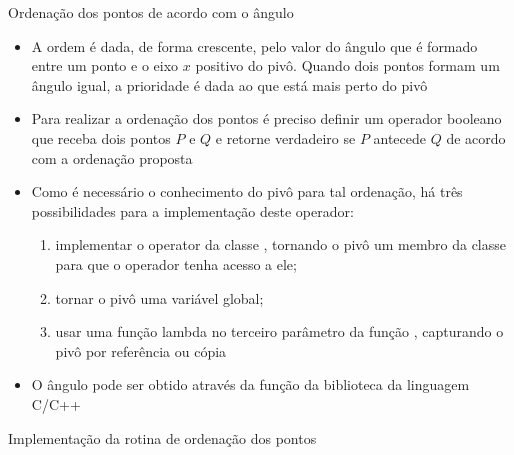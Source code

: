 \begin{frame}[fragile]{Ordenação dos pontos de acordo com o ângulo}

    \begin{itemize}
        \item A ordem é dada, de forma crescente, pelo valor do ângulo que é formado entre um
           ponto e o eixo $x$ positivo do pivô. Quando dois pontos formam um ângulo igual,
           a prioridade é dada ao que está mais perto do pivô
        \pause

        \item Para realizar a ordenação dos pontos é preciso definir um operador booleano que
        receba dois pontos $P$ e $Q$ e retorne verdadeiro se $P$ antecede $Q$ de
        acordo com a ordenação proposta
        \pause

        \item Como é necessário o conhecimento do pivô para tal ordenação, há três possibilidades 
            para a implementação deste operador:
        \pause

        \begin{enumerate}
            \item implementar o operator  da classe , tornando o pivô um 
                membro da classe para que o operador tenha acesso a ele;
        \pause
            \item tornar o pivô uma variável global;
        \pause
            \item usar uma função lambda no terceiro parâmetro da função , 
                capturando o pivô por referência ou cópia
        \pause
        \end{enumerate}

        \item O ângulo pode ser obtido através da função  da biblioteca  da linguagem C/C++
    \end{itemize}

\end{frame}



\begin{frame}[fragile]{Implementação da rotina de ordenação dos pontos}
\end{frame}

